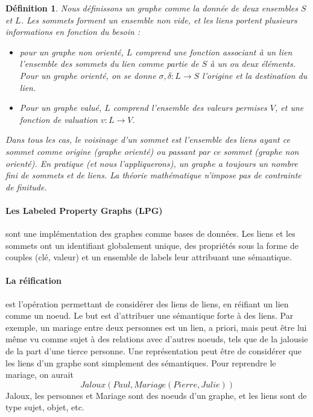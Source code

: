 \documentclass[11pt,a4paper]{report}
\newtheorem{definition}{Définition}
\begin{document}
	\begin{definition}
		Nous définissons un graphe comme la donnée de deux ensembles $S$ et $L$. Les sommets forment un ensemble non vide, et les liens portent plusieurs informations en fonction du besoin : 
		\begin{itemize}
			\item pour un graphe non orienté, $L$ comprend une fonction associant à un lien l'ensemble des sommets du lien comme partie de $S$ à un ou deux éléments. Pour un graphe orienté, on se donne $\sigma,\delta: L \rightarrow S$ l'origine et la destination du lien. 
			\item Pour un graphe valué, $L$ comprend l'ensemble des valeurs permises $V$, et une fonction de valuation $v : L \rightarrow V$. 
		\end{itemize}
		
		Dans tous les cas, le voisinage d'un sommet est l'ensemble des liens ayant ce sommet comme origine (graphe orienté) ou passant par ce sommet (graphe non orienté). En pratique (et nous l'appliquerons), un graphe a toujours un nombre fini de sommets et de liens. La théorie mathématique n'impose pas de contrainte de finitude. 
	\end{definition}
	
	\paragraph{Les \og{}Labeled Property Graphs (LPG)\fg{}} sont une implémentation des graphes comme bases de données. Les liens et les sommets ont un identifiant globalement unique, des propriétés sous la forme de couples (clé, valeur) et un ensemble de \og{}labels\fg{} leur attribuant une sémantique. 
	
	\paragraph{La réification} est l'opération permettant de considérer des liens de liens, en réifiant un lien comme un noeud. Le but est d'attribuer une sémantique forte à des liens. Par exemple, un mariage entre deux personnes est un lien, a priori, mais peut être lui même vu comme sujet à des relations avec d'autres noeuds, tels que de la jalousie de la part d'une tierce personne. Une représentation peut être de considérer que les liens d'un graphe sont simplement des sémantiques. Pour reprendre le mariage, on aurait $$Jaloux(Paul, Mariage(Pierre, Julie))$$ Jaloux, les personnes et Mariage sont des noeuds d'un graphe, et les liens sont de type \og{}sujet\fg{}, \og{}objet\fg{}, etc. 
	
\end{document}
